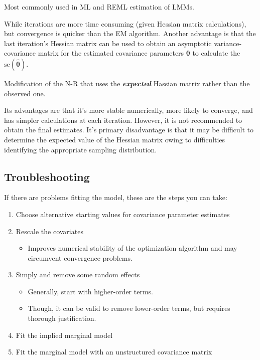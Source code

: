 \documentclass[english]{article}
\begin{document}
\begin{multicols*}{2}
\begin{definitionNOHFILL}
Most commonly used in ML and REML estimation of LMMs.

\bigskip

While iterations are more time consuming (given Hessian matrix calculations), but convergence is quicker than the EM algorithm. Another advantage is that the last iteration's Hessian matrix can be used to obtain an asymptotic variance-covariance matrix for the estimated covariance parameters $\bm{\theta}$ to calculate the $\text{se}(\hat{\bm{\theta}})$.
\end{definitionNOHFILL}


\begin{definitionNOHFILL}
Modification of the N-R that uses the \textit{\textbf{expected}} Hassian matrix rather than the observed one. 

\bigskip

Its advantages are that it's more stable numerically, more likely to converge, and has simpler calculations at each iteration. However, it is not recommended to obtain the final estimates. It's primary disadvantage is that it may be difficult to determine the expected value of the Hessian matrix owing to difficulties identifying the appropriate sampling distribution.
\end{definitionNOHFILL}



\subsection{Troubleshooting}
If there are problems fitting the model, these are the steps you can take:
\begin{enumerate}
	\item	Choose alternative starting values for covariance parameter estimates
	\item	Rescale the covariates
		\begin{itemize}
		\item	Improves numerical stability of the optimization algorithm and may circumvent convergence problems.
		\end{itemize}
	\item	Simply and remove some random effects
		\begin{itemize}
		\item	Generally, start with higher-order terms.
		\item	Though, it can be valid to remove lower-order terms, but requires thorough justification.
		\end{itemize}
	\item	Fit the implied marginal model
	\item	Fit the marginal model with an unstructured covariance matrix
\end{enumerate}


\end{multicols*}
\end{document}
